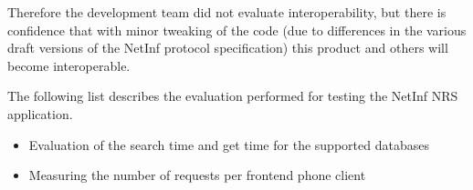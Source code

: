 Therefore the development team did not evaluate interoperability, but there is confidence
that with minor tweaking of the code (due to differences in the various draft versions of
the NetInf protocol specification) this product and others will become interoperable.

The following list describes the evaluation performed for testing the NetInf NRS application.

\begin{itemize}
\item Evaluation of the search time and get time for the supported databases
\item Measuring the number of requests per frontend phone client
\end{itemize}
